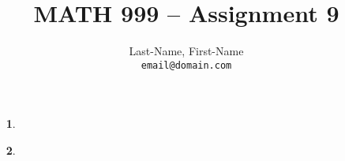 \newcommand{\preamblefolder}{./include}       %

\usepackage[enable]{easy-todo}                %

\title{MATH 999 -- Assignment 9}
\author{
  Last-Name, First-Name\\
  \texttt{email@domain.com}
}


  \maketitle

    \begin{enumerate}
      \item[\textbf{1}.]
      
        \aspace
      
      \qspace

      \item[\textbf{2}.]
      
        \aspace

      
      
    \end{enumerate}


  \listoftodos

  \begin{bibdiv}
    \begin{biblist}
    \end{biblist}
  \end{bibdiv}



